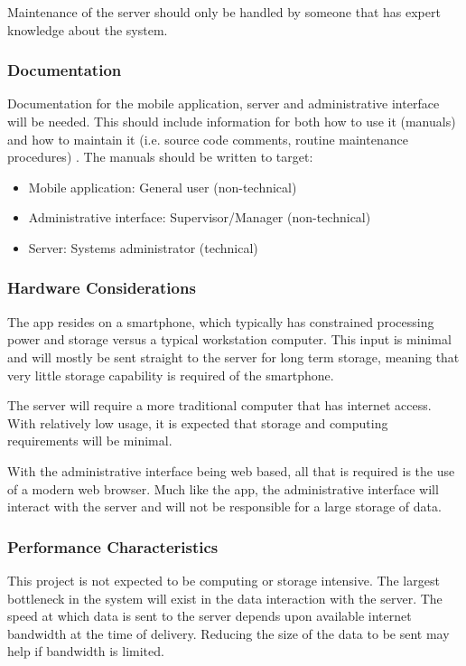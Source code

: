 \documentclass[a4paper, 11pt, titlepage]{article}
\begin{document}
Maintenance of the server should only be handled by someone that has expert knowledge about the system.

\subsubsection{Documentation}
Documentation for the mobile application, server and administrative interface will be needed. This should include information for both how to use it (manuals) and how to maintain it (i.e. source code comments, routine maintenance procedures)
.
The manuals should be written to target:
\begin{itemize}
	\item Mobile application: General user (non-technical)
	\item Administrative interface: Supervisor/Manager (non-technical)
	\item Server: Systems administrator (technical)
\end{itemize}

\subsubsection{Hardware Considerations}
The app resides on a smartphone, which typically has constrained processing power and storage versus a typical workstation computer. This input is minimal and will mostly be sent straight to the server for long term storage, meaning that very little storage capability is required of the smartphone. 

The server will require a more traditional computer that has internet access. With relatively low usage, it is expected that storage and computing requirements will be minimal.

With the administrative interface being web based, all that is required is the use of a modern web browser. Much like the app, the administrative interface will interact with the server and will not be responsible for a large storage of data.

\subsubsection{Performance Characteristics}
This project is not expected to be computing or storage intensive. The largest bottleneck in the system will exist in the data interaction with the server. The speed at which data is sent to the server depends upon available internet bandwidth at the time of delivery. Reducing the size of the data to be sent may help if bandwidth is limited. 
\end{document}
